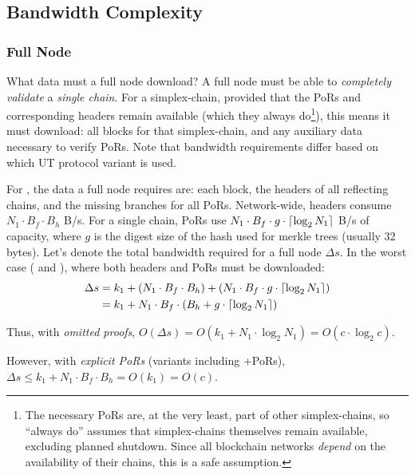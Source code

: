 
\hypertarget{bandwidth-complexity}{%
\subsection{Bandwidth Complexity}\label{bandwidth-complexity}}

\label{sec:bandwidth-complexity}

\subsubsection{Full Node}

What data must a full node download?
A full node must be able to \emph{completely validate} a \emph{single chain}.
For a simplex-chain, provided that the PoRs and corresponding headers remain available (which they always do\footnote{
    The necessary PoRs are, at the very least, part of other simplex-chains, so ``always do'' assumes that simplex-chains themselves remain available, excluding planned shutdown.
    Since all blockchain networks \emph{depend} on the availability of their chains, this is a safe assumption.
}), this means it must download: all blocks for that simplex-chain, and any auxiliary data necessary to verify PoRs.
Note that bandwidth requirements differ based on which UT protocol variant is used.

For , the data a full node requires are: each block, the headers of all reflecting chains, and the missing branches for all PoRs.
Network-wide, headers consume \(N_1 \cdot B_f \cdot B_h\) B/s.
For a single chain, PoRs use \(N_1 \cdot B_f \cdot g \cdot \lceil\log_2 N_1\rceil\) B/s of capacity, where $g$ is the digest size of the hash used for merkle trees (usually 32 bytes).
Let's denote the total bandwidth required for a full node \(\Delta s\).
In the worst case ( and ), where both headers and PoRs must be downloaded:
\begin{align}
    \Delta s & = k_1 + (N_1 \cdot B_f \cdot B_h) + (N_1 \cdot B_f \cdot g \cdot \lceil\log_2 N_1\rceil) \nonumber \\
    & = k_1 + N_1 \cdot B_f \cdot ( B_h + g \cdot \lceil\log_2 N_1\rceil) \nonumber
\end{align}

Thus, with \emph{omitted proofs}, \(O(\Delta s) = O(k_1 + N_1 \cdot \log_2 N_1) = O(c \cdot \log_2 c)\).

However, with \emph{explicit PoRs} (variants including +PoRs), \(\Delta s \le k_1 + N_1 \cdot B_f \cdot B_h = O(k_1) = O(c)\).

